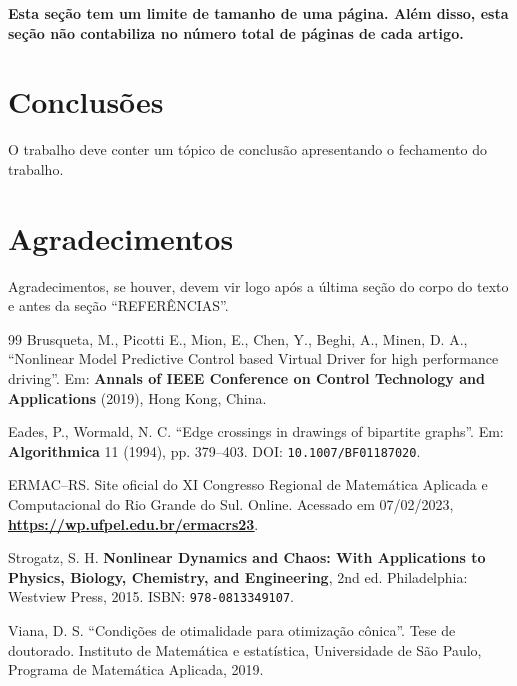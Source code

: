\documentclass{ermacrs2023}
\begin{document}
  \textbf{Esta seção tem um limite de tamanho de uma página. Além disso, esta seção não contabiliza no número total de páginas de cada artigo.}
  
  \section{Conclusões}
  
  O trabalho deve conter um tópico de conclusão apresentando o fechamento do trabalho.
  
  \section*{Agradecimentos}
  
  Agradecimentos, se houver, devem vir logo após a última seção do corpo do texto e antes da seção “REFERÊNCIAS”.
  
  \begin{thebibliography}{99}
    Brusqueta, M., Picotti E., Mion, E., Chen, Y., Beghi, A., Minen, D. A., ``Nonlinear Model Predictive Control based Virtual Driver for high performance driving''. Em: {\bf Annals of IEEE Conference on Control Technology and Applications} (2019), Hong Kong, China.
      
     Eades, P.,  Wormald, N. C.  ``Edge crossings in drawings of bipartite graphs''. Em: {\bf Algorithmica} 11 (1994), pp. 379--403. DOI: \texttt{10.1007/BF01187020}.

     ERMAC--RS. Site oficial do XI Congresso Regional de Matemática Aplicada e Computacional do Rio Grande do Sul. Online. Acessado em 07/02/2023, \href{https://wp.ufpel.edu.br/ermacrs23}{\textbf{\underline{https://wp.ufpel.edu.br/ermacrs23}}}.
      
    Strogatz, S. H. {\bf Nonlinear Dynamics and Chaos: With Applications to Physics, Biology, Chemistry, and Engineering},  2nd ed. Philadelphia: Westview Press, 2015. ISBN: \texttt{978-0813349107}.
      
     Viana, D. S.  ``Condições de otimalidade para otimização cônica''. Tese de doutorado. Instituto de Matemática e estatística, Universidade de São Paulo, Programa de Matemática Aplicada, 2019.
  \end{thebibliography}
\end{document}
